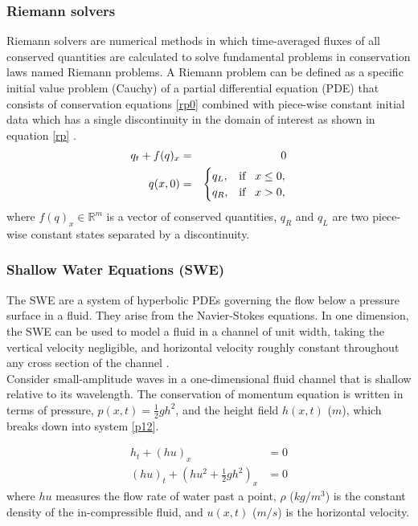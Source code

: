 \documentclass[12pt,a4paper]{article}
\begin{document}
 \subsubsection{Riemann solvers}
 Riemann solvers are numerical methods in which time-averaged fluxes of all conserved quantities are calculated to solve fundamental problems in conservation laws named Riemann problems.   A Riemann problem can be defined as a specific initial value problem  (Cauchy) of a partial differential equation (PDE) that consists of conservation equations \eqref{rp0}  combined with piece-wise constant initial data which has a single discontinuity in the domain of interest as shown in equation \eqref{rp}  \citep{ge:2011}. 
 \begin{eqnarray}
 	q_{t} + f(q)_{x}& =& 0
 	\label{rp0}\\
 	q(x,0)& =& \begin{cases}
 		q_{L}, & \text{if \, $x \le 0,$}\\
 		q_{R},& \text{if \, $x > 0,$}\\
 		
 	\end{cases}  
 	\label{rp}     
 \end{eqnarray}
 where $f(q)_{x} \in \mathbb{R}^{m}$ is a vector of conserved quantities,  $q_{R}$ and $q_{L}$ are two piece-wise constant states separated by a discontinuity. 
 
 \subsubsection{Shallow Water Equations (SWE)}
 The SWE are a system of hyperbolic PDEs governing the flow below a pressure surface in a fluid. They arise from the Navier-Stokes equations.  In one dimension, the SWE  can be used to model a fluid in a channel of unit width, taking the vertical velocity negligible, and horizontal velocity roughly constant throughout any cross section of the channel  \citep{ge:2008}.  \\
 
 Consider small-amplitude waves in a one-dimensional fluid channel that is shallow relative to its wavelength. The conservation of momentum equation is written in terms of pressure, $p(x,t) = \frac{1}{2} gh^{2}$, and the height field $h(x,t)$ ($m$), which breaks down into system \eqref{p12}.
 
 \begin{equation}
 	\begin{aligned}
 		h_{t} + (hu)_x &= 0 \\
 		(hu)_t + \left(hu^{2} + \frac{1}{2} gh^{2} \right)_x & = 0 
 	\end{aligned}
 	\label{p12}
 \end{equation}	
 where $hu$ measures the flow rate of water past a point,  $\rho$ ($kg/m^3$) is the constant density of the in-compressible fluid, and $u(x,t)$ ($m/s$) is the horizontal velocity. \\
 
\end{document}
